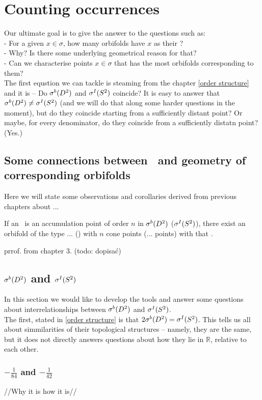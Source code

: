 \chapter{Counting occurrences} \label{counting occurrences}
Our ultimate goal is to give the answer to the questions such as: \\
- For a given $x \in \sigma$, how many orbifolds have $x$ as their \Eoc?\\
- Why? Is there some underlying geometrical reason for that?\\
- Can we characterise points $x \in \sigma$ that has the most orbifolds corresponding to them? \\
The first equstion we can tackle is steaming from the chapter \ref{order structure} 
and it is -- Do ${\mathcal{\sigma}^b(D^2)}$ and ${\mathcal{\sigma}^I(S^2)}$ coincide? It is easy to answer that ${\mathcal{\sigma}^b(D^2)} \neq {\mathcal{\sigma}^I(S^2)}$ 
(and we will do that along some harder questions in the moment), but do they coincide 
starting from a sufficiently distant point? Or maybe, for every denominator, do they coincide 
from a sufficiently distatn point? (Yes.) \\
\section{Some connections between \Eoc\ and geometry of corresponding orbifolds}
Here we will state some observations and corollaries derived from previous chapters 
about ... \\
\begin{observation}
If an \Eoc\ is an accumulation point of order $n$ in ${\mathcal{\sigma}^b(D^2)}$ (${\mathcal{\sigma}^I(S^2)}$), there exist an 
orbifold of the type ... () with $n$ cone points (... points) with that \Eoc. 
\end{observation}
prrof. from chapter 3. (todo: dopisać)
\section{${\mathcal{\sigma}^b(D^2)}$ and ${\mathcal{\sigma}^I(S^2)}$}
In this section we would like to develop the tools and answer some questions about 
interrelationships between ${\mathcal{\sigma}^b(D^2)}$ and ${\mathcal{\sigma}^I(S^2)}$. \\
The first, stated in \ref{order structure} is that $2{\mathcal{\sigma}^b(D^2)}={\mathcal{\sigma}^I(S^2)}$. 
This tells us all about simmilarities of their topological structures -- namely, they are the same, 
but it does not directly answers questions about how they lie in $\mathbb{R}$, relative 
to each other. \\
\subsection{$-\frac{1}{84}$ and $-\frac{1}{42}$}
//Why it is how it is//
